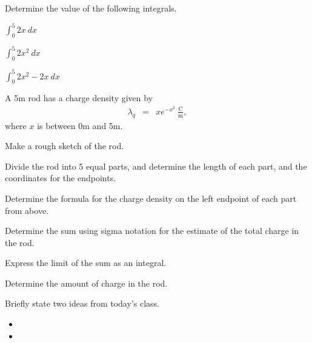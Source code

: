 
\begin{problem}
  \item Determine the value of the following integrals.
    \begin{subproblem}
    \item $\int^5_0 2x ~ dx$
      \vfill
    \item $\int^5_0 2x^2 ~ dx$
      \vfill
    \item $\int^5_0 2x^2 - 2x ~ dx$
      \vfill
    \end{subproblem}
\end{problem}



\begin{problem}
\item A 5m rod has a charge density given by 
  \begin{eqnarray*}
    \lambda_q & = & x e^{-x^2}~\frac{\mathrm{C}}{\mathrm{m}},
  \end{eqnarray*}
  where $x$ is between 0m and 5m. 
  \begin{subproblem}
  \item Make a rough sketch of the rod.
    \vspace{4em}
  \item Divide the rod into 5 equal parts, and determine the length of
    each part, and the coordinates for the endpoints.
    \vfill
  \item Determine the formula for the charge density on the left
    endpoint of each part from above.
    \vfill
    \clearpage
  \item Determine the sum using sigma notation for the estimate of the
    total charge in the rod.
    \vfill
  \item Express the limit of the sum as an integral.
    \vfill
  \item Determine the amount of charge in the rod.
    \vfill
  \end{subproblem}
\end{problem}

\postClass

\begin{problem}
\item Briefly state two ideas from today's class.
  \begin{itemize}
  \item 
  \item 
  \end{itemize}
\item 
  \begin{subproblem}
    \item
  \end{subproblem}
\end{problem}



